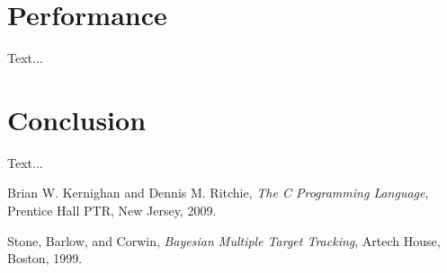 \documentclass{article}
\begin{document}
\section{Performance}
Text...

\section{Conclusion}
Text...

\begin{thebibliography}{9}

  Brian W. Kernighan and Dennis M. Ritchie,
  \emph{The C Programming Language},
  Prentice Hall PTR, New Jersey,
  2009.

  Stone, Barlow, and Corwin,
  \emph{Bayesian Multiple Target Tracking},
  Artech House, Boston,
  1999.

\end{thebibliography}
\end{document}
